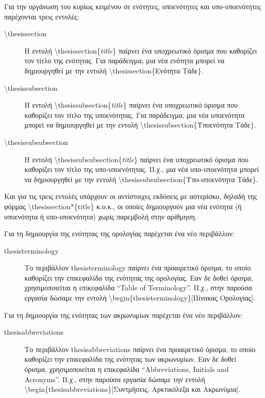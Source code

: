 \documentclass{dithesis}
\begin{document}
Για την οργάνωση του κυρίως κειμένου σε ενότητες, υποενότητες και 
υπο-υποενότητες παρέχονται τρεις εντολές:
\begin{description}
\item[\textbackslash{thesissection}]
  Η εντολή \textbackslash{thesissection}\{\textit{title}\} παίρνει ένα 
  υποχρεωτικό όρισμα που καθορίζει τον τίτλο της ενότητας.
  Για παράδειγμα, μια νέα ενότητα μπορεί να δημιουργηθεί με την εντολή
  \textbackslash{thesissection}\{Ενότητα Tάδε\}.
\item[\textbackslash{thesissubsection}]
  Η εντολή \textbackslash{thesissubsection}\{\textit{title}\} παίρνει ένα 
  υποχρεωτικό όρισμα που καθορίζει τον τίτλο της υποενότητας.
  Για παράδειγμα, μια νέα υποενότητα μπορεί να δημιουργηθεί με την εντολή
  \textbackslash{thesissubsection}\{Υποενότητα Tάδε\}.
\item[\textbackslash{thesissubsubsection}]
  Η εντολή \textbackslash{thesissubsubsection}\{\textit{title}\} παίρνει ένα 
  υποχρεωτικό όρισμα που καθορίζει τον τίτλο της υπο-υποενότητας.
  Π.χ., μια νέα υπο-υποενότητα μπορεί να δημιουργηθεί με την εντολή
  \textbackslash{thesissubsubsection}\{Υπο-υποενότητα Tάδε\}.
\end{description}

Και για τις τρεις εντολές υπάρχουν οι αντίστοιχες εκδόσεις με αστερίσκο,
δηλαδή της φόρμας \textbackslash{thesissection*}\{title\} κ.ο.κ., οι οποίες
δημιουργούν μια νέα ενότητα (ή υποενότητα ή υπο-υποενότητα) χωρίς παρεμβολή
στην αρίθμηση.


Για τη δημιουργία της ενότητας της ορολογίας παρέχεται ένα νέο περιβάλλον:
\begin{description}
\item[thesisterminology]
  Το περιβάλλον thesisterminology παίρνει ένα προαιρετικό όρισμα, το οποίο 
  καθορίζει την επικεφαλίδα της ενότητας της ορολογίας.
  Εαν δε δοθεί όρισμα, χρησιμοποιείται η επικεφαλίδα ``Table of Terminology''.
  Π.χ., στην παρούσα εργασία δώσαμε την εντολή
  \textbackslash{begin}\{thesisterminology\}{[Πίνακας Ορολογίας]}.
\end{description}

Για τη δημιουργία της ενότητας των ακρωνυμίων παρέχεται ένα νέο περιβάλλον:
\begin{description}
\item[thesisabbreviations]
  Το περιβάλλον thesisabbreviations παίρνει ένα προαιρετικό όρισμα, το οποίο 
  καθορίζει την επικεφαλίδα της ενότητας των ακρωνυμίων.
  Εαν δε δοθεί όρισμα, χρησιμοποιείται η επικεφαλίδα ``Abbreviations, Initials
  and Acronyms''.
  Π.χ., στην παρούσα εργασία δώσαμε την εντολή
  \textbackslash{begin}\{thesisabbreviations\}{[Συντμήσεις, Αρκτικόλεξα και
  Ακρωνύμια]}.
\end{description}
\end{document}
